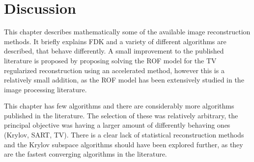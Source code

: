 \section{Discussion}

This chapter describes mathematically some of the available image reconstruction methods. It briefly explains FDK and a variety of different algorithms are described, that behave differently. A small improvement to the published literature is proposed by proposing solving the ROF model for the TV regularized reconstruction using an accelerated method, however this is a relatively small addition, as the ROF model has been extensively studied in the image processing literature.

This chapter has few algorithms and there are considerably more algorithms published in the literature. The selection of these was relatively arbitrary,  the principal objective was having a larger amount of differently behaving ones (Krylov, SART, TV). There is a clear lack of statistical reconstruction methods and the Krylov subspace algorithms should have been explored further, as they are the fastest converging algorithms in the literature.
